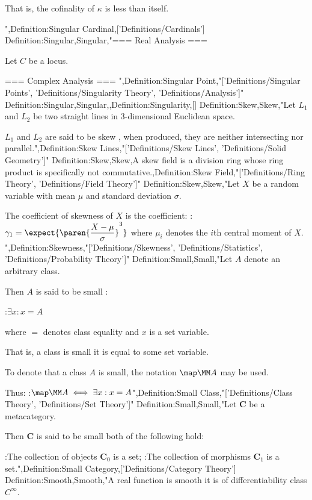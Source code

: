 That is, the cofinality of $\kappa$ is less than itself.

",Definition:Singular Cardinal,['Definitions/Cardinals']
Definition:Singular,Singular,"=== Real Analysis ===

Let $C$ be a locus.


=== Complex Analysis ===
",Definition:Singular Point,"['Definitions/Singular Points', 'Definitions/Singularity Theory', 'Definitions/Analysis']"
Definition:Singular,Singular,,Definition:Singularity,[]
Definition:Skew,Skew,"Let $L_1$ and $L_2$ be two straight lines in $3$-dimensional Euclidean space.


$L_1$ and $L_2$ are said to be skew , when produced, they are neither intersecting nor parallel.",Definition:Skew Lines,"['Definitions/Skew Lines', 'Definitions/Solid Geometry']"
Definition:Skew,Skew,A skew field is a division ring whose ring product is specifically not commutative.,Definition:Skew Field,"['Definitions/Ring Theory', 'Definitions/Field Theory']"
Definition:Skew,Skew,"Let $X$ be a random variable with mean $\mu$ and standard deviation $\sigma$.

The coefficient of skewness of $X$ is the coefficient:
:$\gamma_1 = \expect {\paren {\dfrac {X - \mu} \sigma}^3}$
where $\mu_i$ denotes the $i$th central moment of $X$.
",Definition:Skewness,"['Definitions/Skewness', 'Definitions/Statistics', 'Definitions/Probability Theory']"
Definition:Small,Small,"Let $A$ denote an arbitrary class.


Then $A$ is said to be small :

:$\exists x: x = A$

where $=$ denotes class equality and $x$ is a set variable.


That is, a class is small  it is equal to some set variable.


To denote that a class $A$ is small, the notation $\map \MM A$ may be used.

Thus:
:$\map \MM A \iff \exists x: x = A$",Definition:Small Class,"['Definitions/Class Theory', 'Definitions/Set Theory']"
Definition:Small,Small,"Let $\mathbf C$ be a metacategory.


Then $\mathbf C$ is said to be small  both of the following hold:

:The collection of objects $\mathbf C_0$ is a set;
:The collection of morphisms $\mathbf C_1$ is a set.",Definition:Small Category,['Definitions/Category Theory']
Definition:Smooth,Smooth,"A real function is smooth  it is of differentiability class $C^\infty$.

